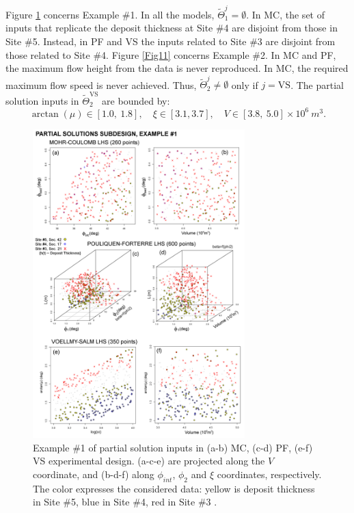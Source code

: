\documentclass[nhess, manuscript]{copernicus}
\begin{document}
Figure \ref{Fig11_0} concerns Example \#1. In all the models, $\tilde\Theta_1^j=\emptyset$. In MC, the set of inputs that replicate the deposit thickness at Site \#4 are disjoint from those in Site \#5. Instead, in PF and VS the inputs related to Site \#3 are disjoint from those related to Site \#4. Figure \ref{Fig11} concerns Example \#2. In MC and PF, the  maximum flow height from the data is never reproduced. In MC, the required maximum flow speed is never achieved. Thus, $\tilde\Theta_2^j\neq\emptyset$ only if $j=\textrm{VS}$. The partial solution inputs in $\tilde\Theta_2^{\textrm{VS}}$ are bounded by:
$$\arctan(\mu) \in [1.0,\ 1.8],\quad \xi\in[3.1, 3.7],\quad V \in [3.8,\ 5.0] \times 10^6\ m^3.$$

\begin{figure}[H]
\centering
\includegraphics[width=0.73\textwidth]{Fig11_0.png}
\caption{Example \#1 of partial solution inputs in (a-b) MC, (c-d) PF, (e-f) VS experimental design. (a-c-e) are projected along the $V$ coordinate, and (b-d-f) along $\phi_{int}$, $\phi_2$ and $\xi$ coordinates, respectively. The color expresses the considered data: yellow is deposit thickness in Site \#5, blue in Site \#4, red in Site \#3 \citep{Saucedo2008}.}
\label{Fig11_0}
\end{figure}
\end{document}
